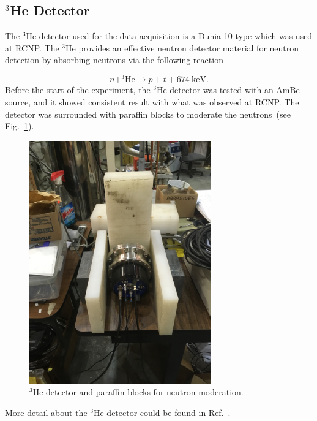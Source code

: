 \subsection{$^3$He Detector}

The $^3$He detector used for the data acquisition is a Dunia-10 type
which was used at RCNP. The $^3$He provides an effective neutron
detector material for neutron detection by absorbing neutrons via the
following reaction

\begin{equation}
  \label{eqn:he3}
n + ^3\mathrm{He} \rightarrow p + t + 674~\mathrm{keV}.
\end{equation}
Before the start of the experiment, the $^3$He detector was tested
with an AmBe source, and it showed consistent result with what was
observed at RCNP. The detector was surrounded with paraffin blocks to
moderate the neutrons~(see Fig.~\ref{fig:he3detector}).

\begin{figure}[h!]
  \centering
  \includegraphics[width=0.7\textwidth, angle = 270]{he3detector.png}
  \caption{$^3$He detector and paraffin blocks for neutron
    moderation.}
  \label{fig:he3detector}
\end{figure}
More detail about the $^3$He detector could be found in
Ref.~\cite{matsumiya_thesis}.

